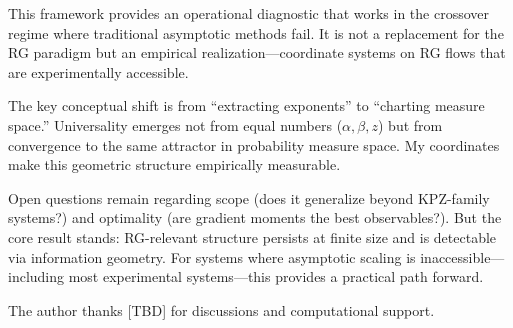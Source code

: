\documentclass[aps,pre,reprint,amsmath,amssymb,superscriptaddress]{revtex4-2}
\begin{document}
This framework provides an operational diagnostic that works in the crossover regime where traditional asymptotic methods fail. It is not a replacement for the RG paradigm but an empirical realization---coordinate systems on RG flows that are experimentally accessible.

The key conceptual shift is from ``extracting exponents'' to ``charting measure space.'' Universality emerges not from equal numbers ($\alpha, \beta, z$) but from convergence to the same attractor in probability measure space. My coordinates make this geometric structure empirically measurable.

Open questions remain regarding scope (does it generalize beyond KPZ-family systems?) and optimality (are gradient moments the best observables?). But the core result stands: RG-relevant structure persists at finite size and is detectable via information geometry. For systems where asymptotic scaling is inaccessible---including most experimental systems---this provides a practical path forward.

\begin{acknowledgments}
The author thanks [TBD] for discussions and computational support.
\end{acknowledgments}
\end{document}
